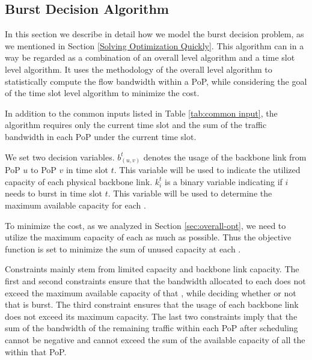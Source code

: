 \subsection{{\EGRESS} Burst Decision Algorithm}
In this section we describe in detail how we model the {\egress} burst decision problem, as we mentioned in Section \ref{Solving Optimization Quickly}. This algorithm can in a way be regarded as a combination of an overall level algorithm and a time slot level algorithm. It uses the methodology of the overall level algorithm to statistically compute the flow bandwidth within a PoP, while considering the goal of the time slot level algorithm to minimize the cost.

 In addition to the common inputs listed in Table \ref{tab:common input}, the algorithm requires only the current time slot and the sum of the traffic bandwidth in each PoP under the current time slot.


 We set two decision variables. $b^t_{(u,v)}$ denotes the usage of the backbone link from PoP $u$ to PoP $v$ in time slot $t$. This variable will be used to indicate the utilized capacity of each physical backbone link. $k_i^t$ is a binary variable indicating if {\egress} $i$ needs to burst in time slot $t$. This variable will be used to determine the maximum available capacity for each {\egress}.

 To minimize the cost, as we analyzed in Section \ref{sec:overall-opt}, we need to utilize the maximum capacity of each {\egress} as much as possible. Thus the objective function is set to minimize the sum of unused capacity at each {\egress}.

 Constraints mainly stem from limited {\egress} capacity and backbone link capacity. The first and second constraints ensure that the bandwidth allocated to each {\egress} does not exceed the maximum available capacity of that {\egress}, while deciding whether or not that {\egress} is burst. The third constraint ensures that the usage of each backbone link does not exceed its maximum capacity. The last two constraints imply that the sum of the bandwidth of the remaining traffic within each PoP after scheduling cannot be negative and cannot exceed the sum of the available capacity of all the {\egresses} within that PoP.

